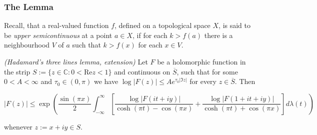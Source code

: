 \subsubsection{The Lemma}
Recall, that a real-valued function $f$, defined on a topological space $X$, is said to be \emph{upper semicontinuous} at a point $a \in X$, if for each $k > f(a)$ there is a neighbourhood $V$ of $a$ such that $k > f(x)$ for each $x \in V$.

\vspace{2mm}

\begin{mdframed}
	\begin{lemma}\emph{(Hadamard's three lines lemma, extension)}
		Let $F$ be a holomorphic function in the strip $S := \{z \in \mathbb{C}: 0 < \mathrm{Re}z < 1\}$ and continuous on $\overline{S}$, such that for some $0 < A < \infty$ and $\tau_0 \in (0,\pi)$ we have $\log \vert F(z)\vert \leqslant A e^{\tau_0 \vert \Im z \vert}$ for every $z \in \overline{S}$. Then

			\begin{equation*}
				\vert F(z) \vert \leqslant \exp\left( \frac{\sin(\pi x)}{2} \int_{-\infty}^\infty \left[ \frac{\log \vert F(it + iy)\vert}{\cosh(\pi t) - \cos(\pi x)} + \frac{\log \vert F(1 + it + iy)\vert}{\cosh(\pi t) + \cos(\pi x)} \right] d\lambda(t)\right)
			\end{equation*}

			whenever $z := x + iy \in S$.
			\label{lem:EHTL}
	\end{lemma}
\end{mdframed}

